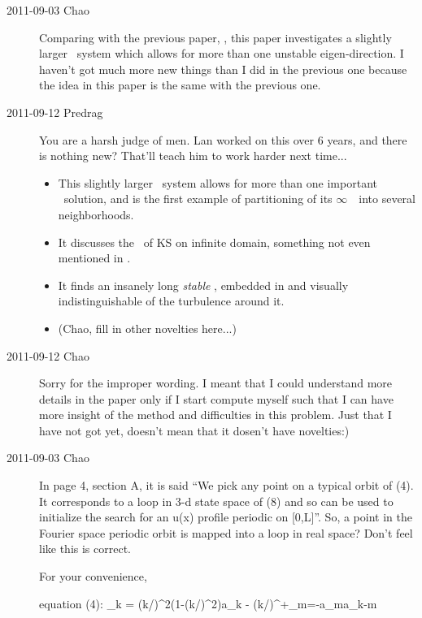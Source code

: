 \begin{description}

\item[2011-09-03 Chao]
Comparing with the previous paper, , this paper
investigates a slightly larger \KS\ system which allows for more than one unstable
eigen-direction. I haven't got much more new things than I did in the previous
one because the idea in this paper is the same with the previous one.

\item[2011-09-12 Predrag] You are a harsh judge of men. Lan worked on
this over 6 years, and there is nothing new? That'll teach him to work
harder next time...
                            \toCB

\begin{itemize}
    \item
This slightly larger \KS\ system allows for more than one important \eqv\
solution, and is the first example of partitioning of its $\infty$\dmn\
\statesp\ into several neighborhoods.
    \item
It discusses the \eqv\ of KS on infinite domain, something not even mentioned
in .
    \item
It finds an insanely long \emph{stable} \po, embedded in and visually
indistinguishable of the turbulence around it.
    \item
(Chao, fill in other novelties here...)
\end{itemize}

\item[2011-09-12 Chao]
Sorry for the improper wording. I meant that I could understand more
details in the paper only if I start compute myself such that I can have
more insight of the method and difficulties in this problem. Just that I
have not got yet, doesn't mean that it dosen't have novelties:)

\item[2011-09-03 Chao]

In page 4, section A, it is said ``We pick any point on a typical orbit
of (4). It corresponds to a loop in 3-d state space of (8) and so can be
used to initialize the search for an u(x) profile periodic on [0,L]''.
So, a point in the Fourier space periodic orbit is mapped into a loop in
real space? Don't feel like this is correct.

For your convenience,

equation (4):
\beq
\displaystyle{}_{k}
= (k/)^{2}(1-(k/)^{2})a_{k}
- (k/\tilde{L})\sum\nolimits^{+\infty}_{m=-\infty}a_{m}a_{k-m}
\eeq


\end{description}
